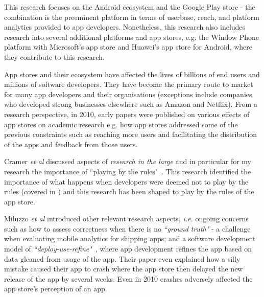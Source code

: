 This research focuses on the Android ecosystem and the Google Play store - the combination is the preeminent platform in terms of userbase, reach, and platform analytics provided to app developers. Nonetheless, this research also includes research into several additional platforms and app stores, e.g. the Window Phone platform with Microsoft's app store and Huawei's app store for Android, where they contribute to this research. %


App stores and their ecosystem have affected the lives of billions of end users and millions of software developers. They have become the primary route to market for many app developers and their organisations (exceptions include companies who developed strong businesses elsewhere such as Amazon and Netflix). 
From a research perspective, in 2010, early papers were published on various effects of app stores on academic research e.g. how app stores addressed some of the previous constraints such as reaching more users and facilitating the distribution of the apps and feedback from those users. 

Cramer \emph{et al} discussed aspects of \emph{research in the large} and in particular for my research the importance of ``playing by the rules"~. This research identified the importance of what happens when developers were deemed not to play by the rules (covered in ) and this research has been shaped to play by the rules of the app store. %

Miluzzo \emph{et al} introduced other relevant research aspects, \textit{i.e.}  ongoing concerns such as how to assess correctness when there is no \emph{``ground truth"} - a challenge when evaluating mobile analytics for shipping apps; and a software development model of \textit{``deploy-use-refine"}~, where app development refines the app based on data gleaned from usage of the app. Their paper even explained how a silly mistake caused their app to crash where the app store then delayed the new release of the app by several weeks. Even in 2010 crashes adversely affected the app store's perception of an app. %


